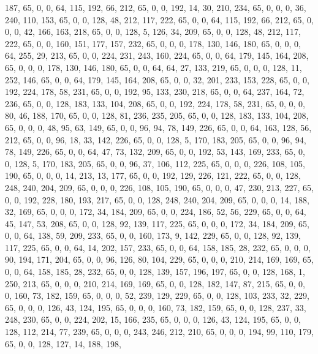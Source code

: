 \begin{DoxyCode}
       187, 65, 0, 0, 64, 115, 192, 66, 212, 65, 0, 0, 192, 14, 30, 210, 234, 65, 0, 0, 0, 36, 240, 110, 153, 65, 0,
       0, 128, 48, 212, 117, 222, 65, 0, 0, 64, 115, 192, 66, 212, 65, 0, 0, 0, 42, 166, 163, 218, 65, 0, 0, 128,
       5, 126, 34, 209, 65, 0, 0, 128, 48, 212, 117, 222, 65, 0, 0, 160, 151, 177, 157, 232, 65, 0, 0, 0, 178, 130,
       146, 180, 65, 0, 0, 0, 64, 255, 29, 213, 65, 0, 0, 224, 231, 243, 160, 224, 65, 0, 0, 64, 179, 145, 164,
       208, 65, 0, 0, 0, 178, 130, 146, 180, 65, 0, 0, 64, 64, 27, 133, 219, 65, 0, 0, 0, 128, 11, 252, 146, 65, 0,
       0, 64, 179, 145, 164, 208, 65, 0, 0, 32, 201, 233, 153, 228, 65, 0, 0, 192, 224, 178, 58, 231, 65, 0, 0, 192,
       95, 133, 230, 218, 65, 0, 0, 64, 237, 164, 72, 236, 65, 0, 0, 128, 183, 133, 104, 208, 65, 0, 0, 192, 224,
       178, 58, 231, 65, 0, 0, 0, 80, 46, 188, 170, 65, 0, 0, 128, 81, 236, 235, 205, 65, 0, 0, 128, 183, 133, 104,
       208, 65, 0, 0, 0, 48, 95, 63, 149, 65, 0, 0, 96, 94, 78, 149, 226, 65, 0, 0, 64, 163, 128, 56, 212, 65, 0,
       0, 96, 18, 33, 142, 226, 65, 0, 0, 128, 5, 170, 183, 205, 65, 0, 0, 96, 94, 78, 149, 226, 65, 0, 0, 64, 47,
       73, 132, 209, 65, 0, 0, 192, 53, 143, 169, 233, 65, 0, 0, 128, 5, 170, 183, 205, 65, 0, 0, 96, 37, 106, 112,
       225, 65, 0, 0, 0, 226, 108, 105, 190, 65, 0, 0, 0, 14, 213, 13, 177, 65, 0, 0, 192, 129, 226, 121, 222, 65,
       0, 0, 128, 248, 240, 204, 209, 65, 0, 0, 0, 226, 108, 105, 190, 65, 0, 0, 0, 47, 230, 213, 227, 65, 0, 0,
       192, 228, 180, 193, 217, 65, 0, 0, 128, 248, 240, 204, 209, 65, 0, 0, 0, 14, 188, 32, 169, 65, 0, 0, 0, 172,
       34, 184, 209, 65, 0, 0, 224, 186, 52, 56, 229, 65, 0, 0, 64, 45, 147, 53, 208, 65, 0, 0, 128, 92, 139, 117,
       225, 65, 0, 0, 0, 172, 34, 184, 209, 65, 0, 0, 64, 138, 59, 209, 233, 65, 0, 0, 160, 173, 9, 142, 229, 65,
       0, 0, 128, 92, 139, 117, 225, 65, 0, 0, 64, 14, 202, 157, 233, 65, 0, 0, 64, 158, 185, 28, 232, 65, 0, 0, 0,
       90, 194, 171, 204, 65, 0, 0, 96, 126, 80, 104, 229, 65, 0, 0, 0, 210, 214, 169, 169, 65, 0, 0, 64, 158, 185,
       28, 232, 65, 0, 0, 128, 139, 157, 196, 197, 65, 0, 0, 128, 168, 1, 250, 213, 65, 0, 0, 0, 210, 214, 169,
       169, 65, 0, 0, 128, 182, 147, 87, 215, 65, 0, 0, 0, 160, 73, 182, 159, 65, 0, 0, 0, 52, 239, 129, 229, 65, 0,
       0, 128, 103, 233, 32, 229, 65, 0, 0, 0, 126, 43, 124, 195, 65, 0, 0, 0, 160, 73, 182, 159, 65, 0, 0, 128,
       237, 33, 248, 230, 65, 0, 0, 224, 202, 15, 166, 235, 65, 0, 0, 0, 126, 43, 124, 195, 65, 0, 0, 128, 112, 214,
       77, 239, 65, 0, 0, 0, 243, 246, 212, 210, 65, 0, 0, 0, 194, 99, 110, 179, 65, 0, 0, 128, 127, 14, 188, 198,

\end{DoxyCode}
